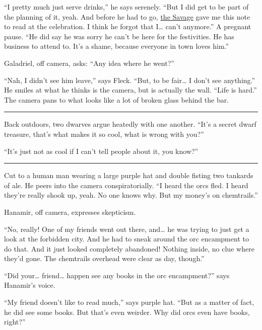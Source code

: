\documentclass[smalldemyvopaper,11pt,twoside,onecolumn,openright,extrafontsizes]{memoir}
\begin{document}
``I pretty much just serve drinks,'' he says serenely. ``But I did get
to be part of the planning of it, yeah. And before he had to go,
\href{/characters/the-savage/}{the Savage} gave me this note to read at
the celebration. I think he forgot that I\ldots{} can't anymore.'' A
pregnant pause. ``He did say he was sorry he can't be here for the
festivities. He has business to attend to. It's a shame, because
everyone in town loves him.''

Galadriel, off camera, asks: ``Any idea where he went?''

``Nah, I didn't see him leave,'' says Fleck. ``But, to be fair\ldots{} I
don't see anything.'' He smiles at what he thinks is the camera, but is
actually the wall. ``Life is hard.'' The camera pans to what looks like
a lot of broken glass behind the bar.

\begin{center}\rule{0.5\linewidth}{\linethickness}\end{center}

Back outdoors, two dwarves argue heatedly with one another. ``It's a
secret dwarf treasure, that's what makes it so cool, what is wrong with
you?''

``It's just not as cool if I can't tell people about it, you know?''

\begin{center}\rule{0.5\linewidth}{\linethickness}\end{center}

Cut to a human man wearing a large purple hat and double fisting two
tankards of ale. He peers into the camera conspiratorially. ``I heard
the orcs fled. I heard they're really shook up, yeah. No one knows why.
But my money's on chemtrails.''

Hanamir, off camera, expresses skepticism.

``No, really! One of my friends went out there, and\ldots{} he was
trying to just get a look at the forbidden city. And he had to sneak
around the orc encampment to do that. And it just looked completely
abandoned! Nothing inside, no clue where they'd gone. The chemtrails
overhead were clear as day, though.''

``Did your\ldots{} friend\ldots{} happen see any books in the orc
encampment?'' says Hanamir's voice.

``My friend doesn't like to read much,'' says purple hat. ``But as a
matter of fact, he did see some books. But that's even weirder. Why did
orcs even have books, right?''
\end{document}
